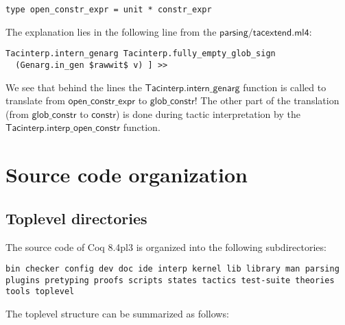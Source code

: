 \documentclass[a4paper,oneside]{book}
\newcommand{\m}[1]{\ensuremath{\mathsf{#1}}}
\begin{document}
\begin{lstlisting}
type open_constr_expr = unit * constr_expr
\end{lstlisting}
The explanation lies in the following line from the
\m{parsing/tacextend.ml4}:

\begin{lstlisting}
Tacinterp.intern_genarg Tacinterp.fully_empty_glob_sign
  (Genarg.in_gen $rawwit$ v) ] >>
\end{lstlisting}
We see that behind the lines the \m{Tacinterp.intern\_genarg} function
is called to translate from \m{open\_constr\_expr} to
\m{glob\_constr}! The other part of the translation (from
\m{glob\_constr} to \m{constr}) is done during tactic interpretation
by the \m{Tacinterp.interp\_open\_constr} function.

\chapter{Source code organization}

\section{Toplevel directories}

The source code of Coq 8.4pl3 is organized into the following
subdirectories:
\begin{lstlisting}
bin checker config dev doc ide interp kernel lib library man parsing
plugins pretyping proofs scripts states tactics test-suite theories
tools toplevel
\end{lstlisting}

\noindent
The toplevel structure can be summarized as follows: \\
\end{document}
